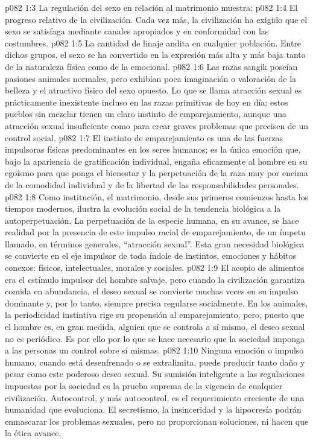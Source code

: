 \vs p082 1:3 \pc La regulación del sexo en relación al matrimonio muestra:
\vs p082 1:4 El progreso relativo de la civilización. Cada vez más, la civilización ha exigido que el sexo se satisfaga mediante canales apropiados y en conformidad con las costumbres.
\vs p082 1:5 La cantidad de linaje andita en cualquier población. Entre dichos grupos, el sexo se ha convertido en la expresión más alta y más baja tanto de la naturaleza física como de la emocional.
\vs p082 1:6 \pc Las razas sangik poseían pasiones animales normales, pero exhibían poca imaginación o valoración de la belleza y el atractivo físico del sexo opuesto. Lo que se llama atracción sexual es prácticamente inexistente incluso en las razas primitivas de hoy en día; estos pueblos sin mezclar tienen un claro instinto de emparejamiento, aunque una atracción sexual insuficiente como para crear graves problemas que precisen de un control social.
\vs p082 1:7 El instinto de emparejamiento es una de las fuerzas impulsoras físicas predominantes en los seres humanos; es la única emoción que, bajo la apariencia de gratificación individual, engaña eficazmente al hombre en su egoísmo para que ponga el bienestar y la perpetuación de la raza muy por encima de la comodidad individual y de la libertad de las responsabilidades personales.
\vs p082 1:8 Como institución, el matrimonio, desde sus primeros comienzos hasta los tiempos modernos, ilustra la evolución social de la tendencia biológica a la autoperpetuación. La perpetuación de la especie humana, en su avance, se hace realidad por la presencia de este impulso racial de emparejamiento, de un ímpetu llamado, en términos generales, “atracción sexual”. Esta gran necesidad biológica se convierte en el eje impulsor de toda índole de instintos, emociones y hábitos conexos: físicos, intelectuales, morales y sociales.
\vs p082 1:9 El acopio de alimentos era el estímulo impulsor del hombre salvaje, pero cuando la civilización garantiza comida en abundancia, el deseo sexual se convierte muchas veces en su impulso dominante y, por lo tanto, siempre precisa regularse socialmente. En los animales, la periodicidad instintiva rige su propensión al emparejamiento, pero, puesto que el hombre es, en gran medida, alguien que se controla a sí mismo, el deseo sexual no es periódico. Es por ello por lo que se hace necesario que la sociedad imponga a las personas un control sobre sí mismas.
\vs p082 1:10 Ninguna emoción o impulso humano, cuando está desenfrenado o se extralimita, puede producir tanto daño y pesar como este poderoso deseo sexual. Su sumisión inteligente a las regulaciones impuestas por la sociedad es la prueba suprema de la vigencia de cualquier civilización. Autocontrol, y más autocontrol, es el requerimiento creciente de una humanidad que evoluciona. El secretismo, la insinceridad y la hipocresía podrán enmascarar los problemas sexuales, pero no proporcionan soluciones, ni hacen que la ética avance.
